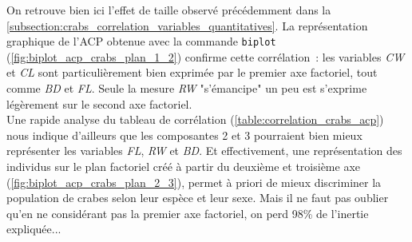 \documentclass[a4paper,11pt]{report}
\begin{document}
On retrouve bien ici l'effet de taille observé précédemment dans la  \autoref{subsection:crabs_correlation_variables_quantitatives}. La représentation graphique de l'ACP obtenue avec la commande \texttt{biplot} (\autoref{fig:biplot_acp_crabs_plan_1_2}) confirme cette corrélation~: les variables \textit{CW} et \textit{CL} sont particulièrement bien exprimée par le premier axe factoriel, tout comme \textit{BD} et \textit{FL}. Seule la mesure \textit{RW} "s'émancipe" un peu est s'exprime légèrement sur le second axe factoriel.\\
Une rapide analyse du tableau de corrélation (\autoref{table:correlation_crabs_acp}) nous indique d'ailleurs que les composantes 2 et 3 pourraient bien mieux représenter les variables \textit{FL}, \textit{RW} et \textit{BD}. Et effectivement, une représentation des individus sur le plan factoriel créé à partir du deuxième et troisième axe (\autoref{fig:biplot_acp_crabs_plan_2_3}), permet à priori de mieux discriminer la population de crabes selon leur espèce et leur sexe. Mais il ne faut pas oublier qu'en ne considérant pas la premier axe factoriel, on perd 98\% de l'inertie expliquée...
\end{document}
